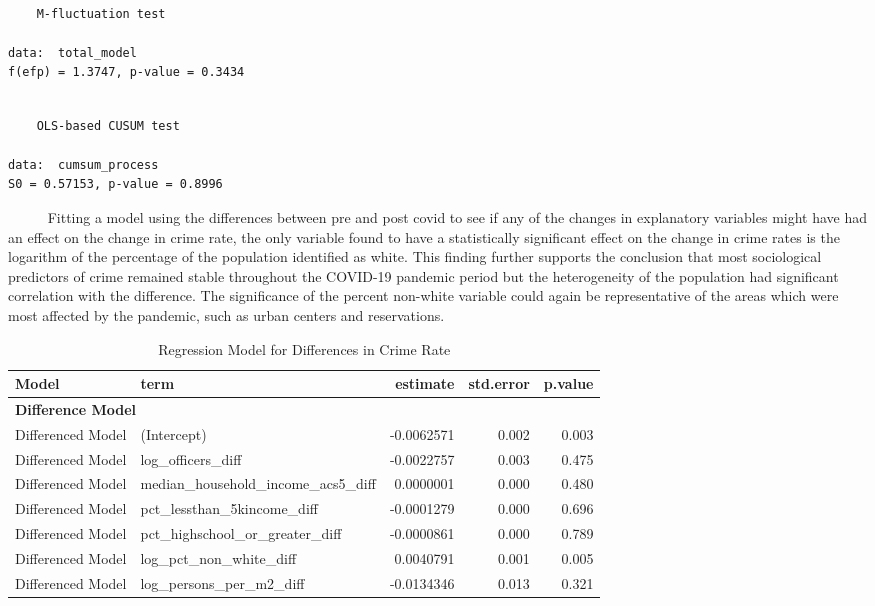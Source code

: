 \documentclass[
  11pt,
  letterpaper,
  DIV=11,
  numbers=noendperiod]{scrartcl}
\begin{document}
\begin{verbatim}

    M-fluctuation test

data:  total_model
f(efp) = 1.3747, p-value = 0.3434
\end{verbatim}

\begin{verbatim}

    OLS-based CUSUM test

data:  cumsum_process
S0 = 0.57153, p-value = 0.8996
\end{verbatim}

~~~~~ Fitting a model using the differences between pre and post covid
to see if any of the changes in explanatory variables might have had an
effect on the change in crime rate, the only variable found to have a
statistically significant effect on the change in crime rates is the
logarithm of the percentage of the population identified as white. This
finding further supports the conclusion that most sociological
predictors of crime remained stable throughout the COVID-19 pandemic
period but the heterogeneity of the population had significant
correlation with the difference. The significance of the percent
non-white variable could again be representative of the areas which were
most affected by the pandemic, such as urban centers and reservations.

\begin{table}

\caption{\label{tab:differenced_data}Regression Model for Differences in Crime Rate}
\centering
\begin{tabular}[t]{l|l|r|r|r}
\hline
Model & term & estimate & std.error & p.value\\
\hline
\multicolumn{5}{l}{\textbf{Difference Model}}\\
\hline
\hspace{1em}Differenced Model & (Intercept) & -0.0062571 & 0.002 & 0.003\\
\hline
\hspace{1em}Differenced Model & log\_officers\_diff & -0.0022757 & 0.003 & 0.475\\
\hline
\hspace{1em}Differenced Model & median\_household\_income\_acs5\_diff & 0.0000001 & 0.000 & 0.480\\
\hline
\hspace{1em}Differenced Model & pct\_lessthan\_5kincome\_diff & -0.0001279 & 0.000 & 0.696\\
\hline
\hspace{1em}Differenced Model & pct\_highschool\_or\_greater\_diff & -0.0000861 & 0.000 & 0.789\\
\hline
\hspace{1em}Differenced Model & log\_pct\_non\_white\_diff & 0.0040791 & 0.001 & 0.005\\
\hline
\hspace{1em}Differenced Model & log\_persons\_per\_m2\_diff & -0.0134346 & 0.013 & 0.321\\
\hline
\end{tabular}
\end{table}
\end{document}
